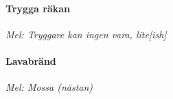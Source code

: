 \documentclass[12pt]{article}
\begin{document}
\noindent
\begin{minipage}{0.5\textwidth}
\paragraph*{Trygga räkan\\}
\vspace{3px}
\textit{Mel: Tryggare kan ingen vara, lite[ish]}\\
\end{minipage}%
\hspace{0.1\textwidth}
\noindent
\begin{minipage}{0.4\textwidth}
\paragraph*{Lavabränd\\}
\vspace{3px}
\textit{Mel: Mossa (nästan)}\\
\end{minipage}
\end{document}
